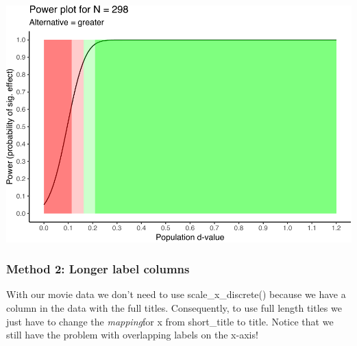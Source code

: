 \documentclass[
]{krantz}
\begin{document}
\includegraphics{bookdown_files/figure-latex/unnamed-chunk-252-1.pdf}

\hypertarget{method-2-longer-label-columns}{%
\subsubsection{Method 2: Longer label columns}\label{method-2-longer-label-columns}}

With our movie data we don't need to use scale\_x\_discrete() because we have a column in the data with the full titles. Consequently, to use full length titles we just have to change the \emph{mapping}for x from short\_title to title. Notice that we still have the problem with overlapping labels on the x-axis!
\end{document}

